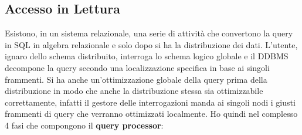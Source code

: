 \subsection{Accesso in Lettura}
Esistono, in un sistema relazionale, una serie di attività che convertono la query in SQL in algebra relazionale e solo dopo si ha la distribuzione dei dati. L'utente, ignaro dello schema distribuito, interroga lo schema logico globale e il DDBMS decompone la query secondo una localizzazione specifica in base ai singoli frammenti. Si ha anche un'ottimizzazione globale della query prima della distribuzione in modo che anche la distribuzione stessa sia ottimizzabile correttamente, infatti il gestore delle interrogazioni manda ai singoli nodi i giusti frammenti di query che verranno ottimizzati localmente. Ho quindi nel complesso 4 fasi che compongono il \textbf{query processor}:
